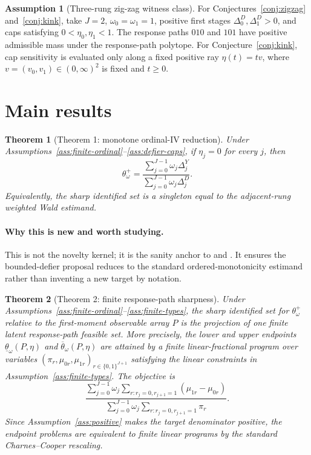 \documentclass[11pt]{article}
\theoremstyle{definition}
\newtheorem{assumption}{Assumption}
\theoremstyle{plain}
\newtheorem{theorem}{Theorem}
\theoremstyle{remark}
\begin{document}
\begin{assumption}[Three-rung zig-zag witness class]\label{ass:zigzag-class}
For Conjectures~\ref{conj:zigzag} and~\ref{conj:kink}, take \(J=2\), \(\omega_0=\omega_1=1\), positive first stages \(\Delta^D_0,\Delta^D_1>0\), and caps satisfying \(0<\eta_0,\eta_1<1\).  The response paths \(010\) and \(101\) have positive admissible mass under the response-path polytope.  For Conjecture~\ref{conj:kink}, cap sensitivity is evaluated only along a fixed positive ray \(\eta(t)=t v\), where \(v=(v_0,v_1)\in(0,\infty)^2\) is fixed and \(t\ge0\).
\end{assumption}

\section{Main results}
\begin{theorem}[Theorem 1: monotone ordinal-IV reduction]\label{thm:monotone-reduction}
Under Assumptions~\ref{ass:finite-ordinal}--\ref{ass:defier-caps}, if \(\eta_j=0\) for every \(j\), then
\[
\theta^+_\omega
=
\frac{\sum_{j=0}^{J-1}\omega_j\Delta^Y_j}
     {\sum_{j=0}^{J-1}\omega_j\Delta^D_j}.
\]
Equivalently, the sharp identified set is a singleton equal to the adjacent-rung weighted Wald estimand.
\end{theorem}
\paragraph{Why this is new and worth studying.}
This is not the novelty kernel; it is the sanity anchor to \citet{ImbensAngrist1994} and \citet{AngristImbens1995}.  It ensures the bounded-defier proposal reduces to the standard ordered-monotonicity estimand rather than inventing a new target by notation.

\begin{theorem}[Theorem 2: finite response-path sharpness]\label{thm:finite-polytope}
Under Assumptions~\ref{ass:finite-ordinal}--\ref{ass:finite-types}, the sharp identified set for \(\theta^+_\omega\) relative to the first-moment observable array \(P\) is the projection of one finite latent response-path feasible set.  More precisely, the lower and upper endpoints \(\underline\theta_\omega(P,\eta)\) and \(\overline\theta_\omega(P,\eta)\) are attained by a finite linear-fractional program over variables \((\pi_r,\mu_{0r},\mu_{1r})_{r\in\{0,1\}^{J+1}}\) satisfying the linear constraints in Assumption~\ref{ass:finite-types}.  The objective is
\[
\frac{\sum_{j=0}^{J-1}\omega_j
  \sum_{r:r_j=0,r_{j+1}=1}(\mu_{1r}-\mu_{0r})}
{\sum_{j=0}^{J-1}\omega_j
  \sum_{r:r_j=0,r_{j+1}=1}\pi_r}.
\]
Since Assumption~\ref{ass:positive} makes the target denominator positive, the endpoint problems are equivalent to finite linear programs by the standard Charnes--Cooper rescaling.
\end{theorem}
\end{document}

